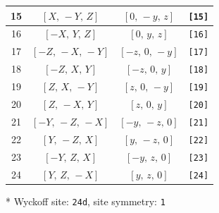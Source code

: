 \documentclass[fleqn,8pt]{jsarticle}
\begin{document}
\begin{longtable}{cccc}
15 & $\left[ X,\, - Y,\, Z \right]$ & $\left[ 0,\, - y,\, z \right]$ & {\tt [15]} \\ \hline
16 & $\left[ - X,\, Y,\, Z \right]$ & $\left[ 0,\, y,\, z \right]$ & {\tt [16]} \\ \hline
17 & $\left[ - Z,\, - X,\, - Y \right]$ & $\left[ - z,\, 0,\, - y \right]$ & {\tt [17]} \\ \hline
18 & $\left[ - Z,\, X,\, Y \right]$ & $\left[ - z,\, 0,\, y \right]$ & {\tt [18]} \\ \hline
19 & $\left[ Z,\, X,\, - Y \right]$ & $\left[ z,\, 0,\, - y \right]$ & {\tt [19]} \\ \hline
20 & $\left[ Z,\, - X,\, Y \right]$ & $\left[ z,\, 0,\, y \right]$ & {\tt [20]} \\ \hline
21 & $\left[ - Y,\, - Z,\, - X \right]$ & $\left[ - y,\, - z,\, 0 \right]$ & {\tt [21]} \\ \hline
22 & $\left[ Y,\, - Z,\, X \right]$ & $\left[ y,\, - z,\, 0 \right]$ & {\tt [22]} \\ \hline
23 & $\left[ - Y,\, Z,\, X \right]$ & $\left[ - y,\, z,\, 0 \right]$ & {\tt [23]} \\ \hline
24 & $\left[ Y,\, Z,\, - X \right]$ & $\left[ y,\, z,\, 0 \right]$ & {\tt [24]} \\
\end{longtable}
* Wyckoff site: {\tt 24d}, site symmetry: {\tt 1}
\renewcommand{\arraystretch}{1.2}
\end{document}
